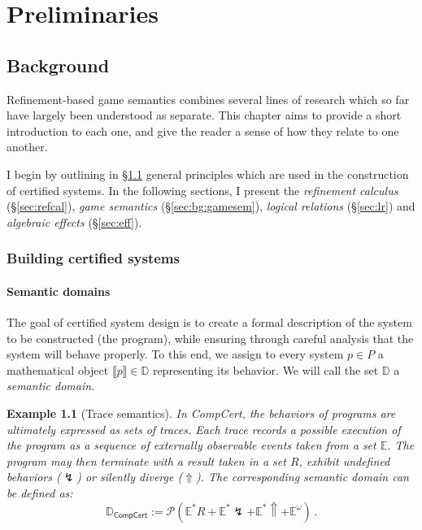\documentclass[11pt,oneside,draft]{book}
\newtheorem{example}[theorem]{Example}
\theoremstyle{definition}
\newcommand{\kw}[1]{\ensuremath{ \mathsf{#1} }}
\begin{document}



\part{Preliminaries} \label{part:prelim}

\chapter{Background} %

Refinement-based game semantics combines
several lines of research
which so far have largely been understood as separate.
This chapter aims to provide a short introduction to each one,
and give the reader a sense of how they relate to one another.

I begin
by outlining in \S\ref{sec:principles} general principles
which are used in the construction of certified systems.
In the following sections,
I present
the \emph{refinement calculus} (\S\ref{sec:refcal}),
\emph{game semantics} (\S\ref{sec:bg:gamesem}),
\emph{logical relations} (\S\ref{sec:lr}) and
\emph{algebraic effects} (\S\ref{sec:eff}).

\section{Building certified systems} \label{sec:principles} %

\subsection{Semantic domains} %

The goal of certified system design is
to create a formal description of
the system to be constructed (the program),
while ensuring
through careful analysis
that the system
will behave properly.
To this end,
we assign
to every system $p \in P$
a mathematical object $\llbracket p \rrbracket \in \mathbb{D}$
representing its behavior.
We will call the set $\mathbb{D}$ a \emph{semantic domain}.

\begin{example}[Trace semantics] \label{ex:trsem} %
In CompCert,
the behaviors of programs are ultimately expressed
as sets of traces.
Each trace records a possible execution of the program
as a sequence of externally observable events
taken from a set $\mathbb{E}$.
The program may then
terminate with a result taken in a set $R$,
exhibit undefined behaviors ($\lightning$)
or silently diverge ($\Uparrow$).
The corresponding semantic domain can be defined as:
\[
  \mathbb{D}_\kw{CompCert} :=
    \mathcal{P}
      (\mathbb{E}^*R +
       \mathbb{E}^*\lightning +
       \mathbb{E}^*\Uparrow +
       \mathbb{E}^\omega)
  \,.
\]
\end{example}
\end{document}
